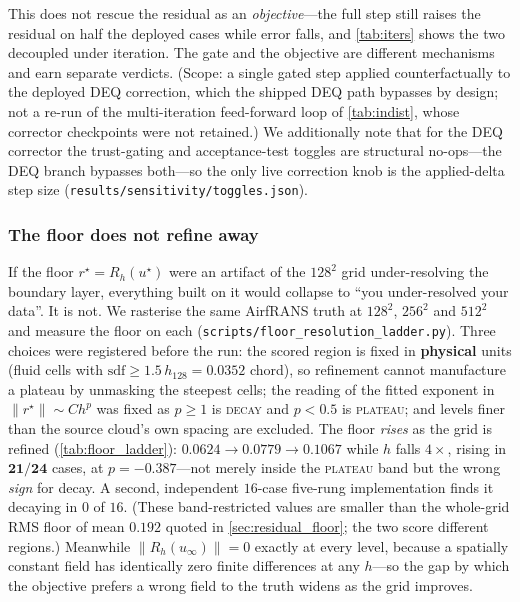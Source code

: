 
This does not rescue the
residual as an \emph{objective}---the full step still raises the residual on half the
deployed cases while error falls, and \autoref{tab:iters} shows the two decoupled
under iteration. The gate and the objective are different mechanisms and earn separate
verdicts. (Scope: a single gated step applied counterfactually to
the deployed DEQ correction, which the shipped DEQ path bypasses by design; not a re-run of
the multi-iteration feed-forward loop of \autoref{tab:indist}, whose corrector checkpoints
were not retained.) We
additionally note that for the DEQ corrector the trust-gating and acceptance-test toggles
are structural no-ops---the DEQ branch bypasses both---so the only live correction knob is
the applied-delta step size (\texttt{results/sensitivity/toggles.json}).



\subsubsection{The floor does not refine away}
\label{sec:floor_ladder}

If the floor $r^\star=R_h(u^\star)$ were an artifact of the $128^2$ grid
under-resolving the boundary layer, everything built on it would collapse to ``you
under-resolved your data''. It is not. We rasterise the same AirfRANS truth at
$128^2$, $256^2$ and $512^2$ and measure the floor on each
(\texttt{scripts/floor\_resolution\_ladder.py}). Three choices were registered before
the run: the scored region is fixed in \textbf{physical} units (fluid cells with
$\mathrm{sdf}\ge 1.5\,h_{128}=0.0352$ chord), so refinement cannot manufacture a plateau
by unmasking the steepest cells; the reading of the fitted exponent in
$\|r^\star\|\sim Ch^{p}$ was fixed as $p\ge1$ is \textsc{decay} and $p<0.5$ is
\textsc{plateau}; and levels finer than the source cloud's own spacing are excluded. The
floor \emph{rises} as the grid is refined (\autoref{tab:floor_ladder}):
$0.0624\to0.0779\to0.1067$ while $h$ falls $4\times$, rising in $\mathbf{21/24}$ cases,
at $p=-0.387$---not merely inside the \textsc{plateau} band but the wrong \emph{sign}
for decay. A second, independent $16$-case five-rung implementation finds it decaying in
$0$ of $16$. (These band-restricted values are smaller than the whole-grid RMS floor of
mean $0.192$ quoted in \autoref{sec:residual_floor}; the two score different regions.)
Meanwhile $\|R_h(u_\infty)\|=0$ exactly at every level, because a spatially constant
field has identically zero finite differences at any $h$---so the gap by which the
objective prefers a wrong field to the truth widens as the grid improves.

